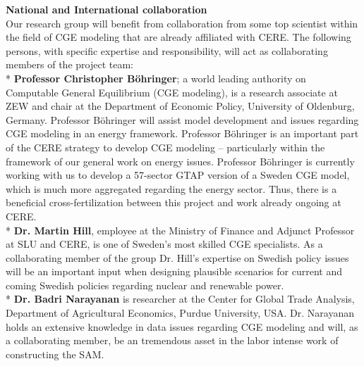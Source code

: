 \textbf{National and International collaboration}\\
Our research group will benefit from collaboration from some top scientist within the field of CGE modeling that are already affiliated with CERE. The following persons, with specific expertise and responsibility, will act as collaborating members of the project team:\\*
\textbf{Professor Christopher Böhringer}; a world leading authority on Computable General Equilibrium (CGE modeling), is a research associate at ZEW and chair at the Department of Economic Policy, University of Oldenburg, Germany. Professor Böhringer will assist model development and issues regarding CGE modeling in an energy framework. Professor Böhringer is an important part of the CERE strategy to develop CGE modeling – particularly within the framework of our general work on energy issues. Professor Böhringer is currently working with us to develop a 57-sector GTAP version of a Sweden CGE model, which is much more aggregated regarding the energy sector. Thus, there is a beneficial cross-fertilization between this project and work already ongoing at CERE.\\*
\textbf{Dr. Martin Hill}, employee at the Ministry of Finance and Adjunct Professor at SLU and CERE, is one of Sweden's most skilled CGE specialists. As a collaborating member of the group Dr. Hill’s expertise on Swedish policy issues will be an important input when designing plausible scenarios for current and coming Swedish policies regarding nuclear and renewable power.\\*
\textbf{Dr. Badri Narayanan} is researcher at the Center for Global Trade Analysis, Department of Agricultural Economics, Purdue University, USA. Dr. Narayanan holds an extensive knowledge in data issues regarding CGE modeling and will, as a collaborating member, be an tremendous asset in the labor intense work of constructing the SAM.
